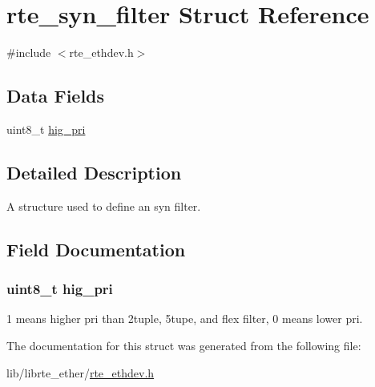 \hypertarget{structrte__syn__filter}{}\section{rte\+\_\+syn\+\_\+filter Struct Reference}
\label{structrte__syn__filter}


{\ttfamily \#include $<$rte\+\_\+ethdev.\+h$>$}

\subsection*{Data Fields}
\begin{DoxyCompactItemize}
\item 
uint8\+\_\+t \hyperlink{structrte__syn__filter_a9edacbb8d588c53283dcbf0d97b63f6e}{hig\+\_\+pri}
\end{DoxyCompactItemize}


\subsection{Detailed Description}
A structure used to define an syn filter. 

\subsection{Field Documentation}
\hypertarget{structrte__syn__filter_a9edacbb8d588c53283dcbf0d97b63f6e}{}
\subsubsection[{hig\+\_\+pri}]{\setlength{\rightskip}{0pt plus 5cm}uint8\+\_\+t hig\+\_\+pri}\label{structrte__syn__filter_a9edacbb8d588c53283dcbf0d97b63f6e}
1 means higher pri than 2tuple, 5tupe, and flex filter, 0 means lower pri. 

The documentation for this struct was generated from the following file\+:\begin{DoxyCompactItemize}
\item 
lib/librte\+\_\+ether/\hyperlink{rte__ethdev_8h}{rte\+\_\+ethdev.\+h}\end{DoxyCompactItemize}
